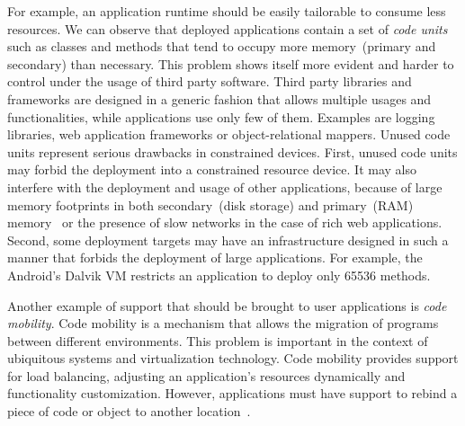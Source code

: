 For example, an application runtime should be easily tailorable to consume less resources. We can observe that deployed applications contain a set of \emph{code units} such as classes and methods that tend to occupy more memory~(primary and secondary) than necessary.
This problem shows itself more evident and harder to control under the usage of third party software. 
Third party libraries and frameworks are designed in a generic fashion that allows multiple usages and functionalities, while applications use only few of them. 
Examples are logging libraries, web application frameworks or object-relational mappers.
Unused code units represent serious drawbacks in constrained devices. 
First, unused code units may forbid the deployment into a constrained resource device.
It may also interfere with the deployment and usage of other applications, because of large memory footprints in both secondary~(disk storage) and primary~(RAM) memory~\cite{Mart12a} or the presence of slow networks in the case of rich web applications.
Second, some deployment targets may have an infrastructure designed in such a manner that forbids the deployment of large applications. For example, the Android's Dalvik VM restricts an application to deploy only 65536 methods.




Another example of support that should be brought to user applications is \emph{code mobility}. Code mobility is a mechanism that allows the migration of programs between different environments. This problem is important in the context of ubiquitous systems and virtualization technology. Code mobility provides support for \eg load balancing, adjusting an application's resources dynamically and functionality customization. However, applications must have support to rebind a piece of code or object to another location~\cite{Fugg98a}.

